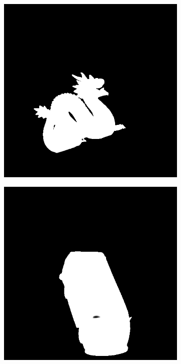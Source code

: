 \documentclass[border=15pt, multi, tikz]{article}
\begin{document}
\begin{figure}[H]
\begin{subfigure}[b]{0.18\linewidth}
	\end{subfigure}
	\begin{subfigure}[b]{0.18\linewidth}
		\includegraphics[width=\linewidth]{./Figures/test_scenes/05113.depth0.png}
	\end{subfigure}
	\begin{subfigure}[b]{0.18\linewidth}
		\includegraphics[width=\linewidth]{./Figures/test_scenes/05126.depth0.png}
	\end{subfigure}


\end{figure}
\end{document}
